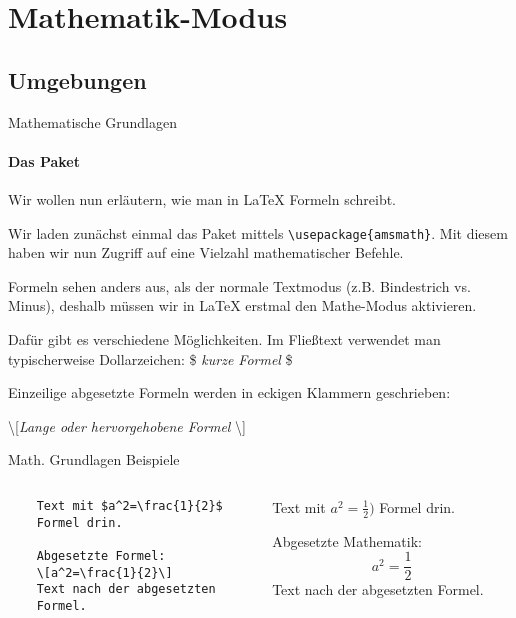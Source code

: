 \section{Mathematik-Modus}
\subsection{Umgebungen}
\begin{frame}[fragile]{Mathematische Grundlagen}
\framesubtitle{Das Paket }
Wir wollen nun erläutern, wie man in \LaTeX{} Formeln schreibt. 

\medskip\pause
Wir laden zunächst einmal das Paket  mittels \verb+\usepackage{amsmath}+. Mit diesem haben wir nun Zugriff auf eine Vielzahl mathematischer Befehle. 

\medskip\pause
Formeln sehen anders aus, als der normale Textmodus (z.B. Bindestrich vs. Minus), deshalb müssen wir in \LaTeX{} erstmal den Mathe-Modus aktivieren. 

\medskip\pause
Dafür gibt es verschiedene Möglichkeiten. Im Fließtext verwendet man typischerweise Dollarzeichen: \$ \emph{kurze Formel} \$

Einzeilige abgesetzte Formeln werden in eckigen Klammern geschrieben: 
\begin{center}
\textbackslash[\emph{Lange oder hervorgehobene Formel} \textbackslash]
\end{center}
\end{frame}

\begin{frame}[fragile]{Math. Grundlagen Beispiele}

\begin{columns}
\begin{column}{.48\textwidth}\footnotesize
\begin{codeblock}
\begin{verbatim}
	Text mit $a^2=\frac{1}{2}$
	Formel drin.

	Abgesetzte Formel:
	\[a^2=\frac{1}{2}\]
	Text nach der abgesetzten
	Formel.
\end{verbatim}
\end{codeblock}
\end{column}
%
\begin{column}{.45\textwidth}		
	Text mit $a^2=\frac{1}{2})$ Formel drin.

	Abgesetzte Mathematik:
	\[a^2=\frac{1}{2}\]
	Text nach der abgesetzten Formel.
\end{column}

\end{columns}
\end{frame}

